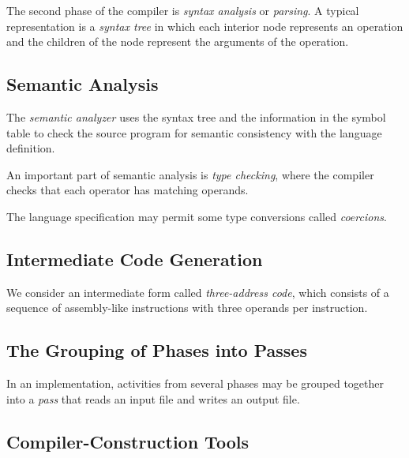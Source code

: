 \documentclass[12pt,a4paper,twoside,openany]{book}
\begin{document}
The second phase of the compiler is \textit{syntax analysis} or \textit{parsing}. A typical representation is a \textit{syntax tree} in which each interior node represents an operation and the children of the node represent the arguments of the operation.

\subsection{Semantic Analysis}

The \textit{semantic analyzer} uses the syntax tree and the information in the symbol table to check the source program for semantic consistency with the language definition.

An important part of semantic analysis is \textit{type checking}, where the compiler checks that each operator has matching operands.

The language specification may permit some type conversions called \textit{coercions}.

\subsection{Intermediate Code Generation}

We consider an intermediate form called \textit{three-address code}, which consists of a sequence of assembly-like instructions with three operands per instruction.

\subsection{The Grouping of Phases into Passes}

In an implementation, activities from several phases may be grouped together into a \textit{pass} that reads an input file and writes an output file.

\subsection{Compiler-Construction Tools}
\end{document}
